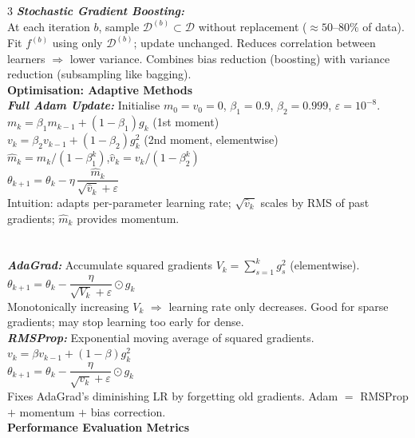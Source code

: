 \documentclass[a4paper,7pt]{article}
\begin{document}
\begin{multicols*}{3}
\textit{\textbf{Stochastic Gradient Boosting:}} \\At each iteration $b$, sample $\mathcal{D}^{(b)}\subset\mathcal{D}$ without replacement ($\approx 50$--$80\%$ of data). Fit $f^{(b)}$ using only $\mathcal{D}^{(b)}$; update unchanged. Reduces correlation between learners $\Rightarrow$ lower variance. Combines bias reduction (boosting) with variance reduction (subsampling like bagging).\\

\textbf{Optimisation: Adaptive Methods}\\

\textit{\textbf{Full Adam Update:}} Initialise $m_0=v_0=0$, $\beta_1=0.9$, $\beta_2=0.999$, $\varepsilon=10^{-8}$.\\
$m_k=\beta_1 m_{k-1}+(1-\beta_1)g_k$ (1st moment)\\
$v_k=\beta_2 v_{k-1}+(1-\beta_2)g_k^2$ (2nd moment, elementwise)\\
$\hat m_k=m_k/(1-\beta_1^k)$,\quad $\hat v_k=v_k/(1-\beta_2^k)$\\
$\theta_{k+1}=\theta_k-\eta\,\dfrac{\hat m_k}{\sqrt{\hat v_k}+\varepsilon}$\\
Intuition: adapts per-parameter learning rate; $\sqrt{\hat v_k}$ scales by RMS of past gradients; $\hat m_k$ provides momentum.\\
\\\\
\textit{\textbf{AdaGrad:}} Accumulate squared gradients $V_k=\sum_{s=1}^k g_s^2$ (elementwise).\\
$\theta_{k+1}=\theta_k-\dfrac{\eta}{\sqrt{V_k}+\varepsilon}\odot g_k$\\
Monotonically increasing $V_k$ $\Rightarrow$ learning rate only decreases. Good for sparse gradients; may stop learning too early for dense.\\

\textit{\textbf{RMSProp:}} Exponential moving average of squared gradients.\\
$v_k=\beta v_{k-1}+(1-\beta)g_k^2$\\
$\theta_{k+1}=\theta_k-\dfrac{\eta}{\sqrt{v_k}+\varepsilon}\odot g_k$\\
Fixes AdaGrad's diminishing LR by forgetting old gradients. Adam $=$ RMSProp $+$ momentum $+$ bias correction.\\

\textbf{Performance Evaluation Metrics}\\


\end{multicols*}
\end{document}
